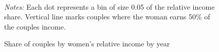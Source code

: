 \begin{figure}[H]
\centering
\caption{Share of couples by women's relative income by year}
\label{fig:figure_3}
  \\  
\par \begin{minipage}[h]{\textwidth}{\scriptsize\textit{Notes:} Each dot represents a bin of size 0.05 of the relative income share. Vertical line marks couples where the woman earns 50\% of the couples income.}\end{minipage}
\end{figure}
